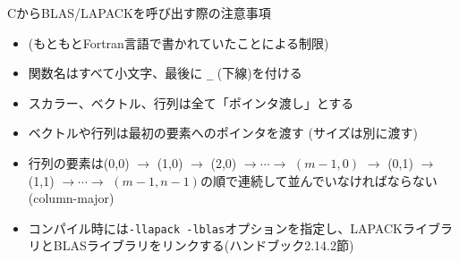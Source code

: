 \begin{frame}[t,fragile]{CからBLAS/LAPACKを呼び出す際の注意事項}
  \begin{itemize}
  \item (もともとFortran言語で書かれていたことによる制限)
  \item 関数名はすべて小文字、最後に \verb+_+ (下線)を付ける
  \item スカラー、ベクトル、行列は全て「ポインタ渡し」とする
  \item ベクトルや行列は最初の要素へのポインタを渡す (サイズは別に渡す)
  \item 行列の要素は(0,0) $\rightarrow$ (1,0) $\rightarrow$ (2,0) $\rightarrow\cdots\rightarrow$ $(m-1,0)$ $\rightarrow$ (0,1) $\rightarrow$ (1,1) $\rightarrow\cdots\rightarrow$ $(m-1,n-1)$の順で連続して並んでいなければならない(column-major)
  \item コンパイル時には{\tt -llapack -lblas}オプションを指定し、LAPACKライブラリとBLASライブラリをリンクする(ハンドブック2.14.2節)
  \end{itemize}
\end{frame}
